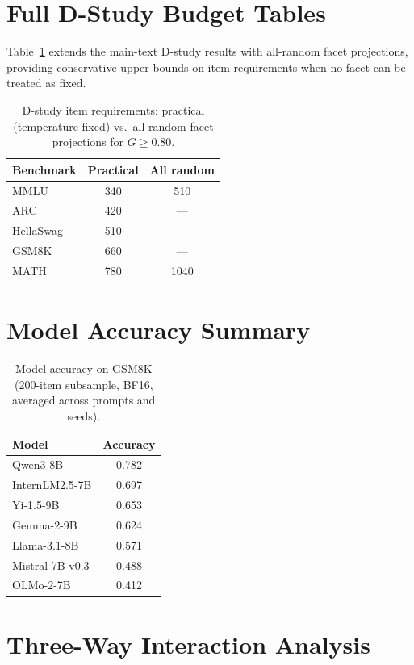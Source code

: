 \documentclass[letterpaper,11pt]{article}
\begin{document}
\appendix

\section{Full D-Study Budget Tables}

Table~\ref{tab:dstudy_full} extends the main-text D-study results with all-random facet projections, providing conservative upper bounds on item requirements when no facet can be treated as fixed.

\begin{table}[h]
\centering
\caption{D-study item requirements: practical (temperature fixed) vs.\ all-random facet projections for $G \geq 0.80$.}
\label{tab:dstudy_full}
\small
\begin{tabular}{lcc}
\toprule
\textbf{Benchmark} & \textbf{Practical} & \textbf{All random} \\
\midrule
MMLU & 340 & 510 \\
ARC & 420 & --- \\
HellaSwag & 510 & --- \\
GSM8K & 660 & --- \\
MATH & 780 & 1040 \\
\bottomrule
\end{tabular}
\end{table}

\section{Model Accuracy Summary}

\begin{table}[h]
\centering
\caption{Model accuracy on GSM8K (200-item subsample, BF16, averaged across prompts and seeds).}
\label{tab:model_accuracy}
\small
\begin{tabular}{lc}
\toprule
\textbf{Model} & \textbf{Accuracy} \\
\midrule
Qwen3-8B & 0.782 \\
InternLM2.5-7B & 0.697 \\
Yi-1.5-9B & 0.653 \\
Gemma-2-9B & 0.624 \\
Llama-3.1-8B & 0.571 \\
Mistral-7B-v0.3 & 0.488 \\
OLMo-2-7B & 0.412 \\
\bottomrule
\end{tabular}
\end{table}

\section{Three-Way Interaction Analysis}
\end{document}
